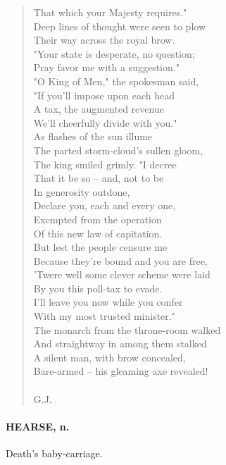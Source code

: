 \documentclass[11pt]{article}
\begin{document}
\begin{quote}
  That which your Majesty requires." \\
  Deep lines of thought were seen to plow \\
  Their way across the royal brow. \\
  "Your state is desperate, no question; \\
  Pray favor me with a suggestion." \\
  "O King of Men," the spokesman said, \\
  "If you'll impose upon each head \\
  A tax, the augmented revenue \\
  We'll cheerfully divide with you." \\
  As flashes of the sun illume \\
  The parted storm-cloud's sullen gloom, \\
  The king smiled grimly.  "I decree \\
  That it be so -- and, not to be \\
  In generosity outdone, \\
  Declare you, each and every one, \\
  Exempted from the operation \\
  Of this new law of capitation. \\
  But lest the people censure me \\
  Because they're bound and you are free, \\
  'Twere well some clever scheme were laid \\
  By you this poll-tax to evade. \\
  I'll leave you now while you confer \\
  With my most trusted minister." \\
  The monarch from the throne-room walked \\
  And straightway in among them stalked \\
  A silent man, with brow concealed, \\
  Bare-armed -- his gleaming axe revealed! \\
 \\
G.J. \end{quote}


\paragraph{HEARSE, n.}  Death's baby-carriage.
\end{document}
